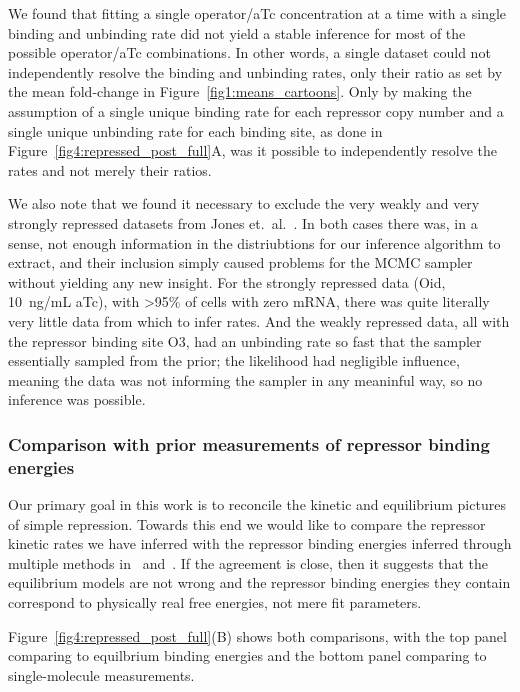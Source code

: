 
We found that fitting a single operator/aTc concentration at a
time with a single binding and unbinding rate did not yield a
stable inference for most of the possible operator/aTc
combinations. In other words, a single dataset could not
independently resolve the binding and unbinding rates, only their
ratio as set by the mean fold-change in
Figure~\ref{fig1:means_cartoons}. Only by making the assumption
of a single unique binding rate for each repressor copy number
and a single unique unbinding rate for each binding site, as done
in Figure~\ref{fig4:repressed_post_full}A, was it possible to
independently resolve the rates and not merely their ratios.

We also note that we found it necessary to exclude the very
weakly and very strongly repressed datasets from Jones et.\
al.~\cite{Jones2014}. In both cases there was, in a sense, not
enough information in the distriubtions for our inference
algorithm to extract, and their inclusion simply caused problems
for the MCMC sampler without yielding any new insight. For the
strongly repressed data (Oid, 10~ng/mL aTc), with >95\% of cells
with zero mRNA, there was quite literally very little data from
which to infer rates. And the weakly repressed data, all with the
repressor binding site O3, had an unbinding rate so fast that the
sampler essentially sampled from the prior; the likelihood had
negligible influence, meaning the data was not informing the
sampler in any meaninful way, so no inference was possible.

\subsubsection{Comparison with prior measurements of repressor binding energies}
Our primary goal in this work is to reconcile the kinetic
and equilibrium pictures of simple repression.
Towards this end we would like to compare the repressor kinetic rates we
have inferred with the repressor binding energies inferred through
multiple methods in~\cite{Garcia2011a} and~\cite{Razo-Mejia2018}.
If the agreement is close, then it suggests that the equilibrium
models are not wrong and the repressor binding energies they contain
correspond to physically real free energies, not mere fit parameters.

Figure~\ref{fig4:repressed_post_full}(B) shows both comparisons,
with the top panel comparing to equilbrium binding energies
and the bottom panel comparing to single-molecule measurements.

